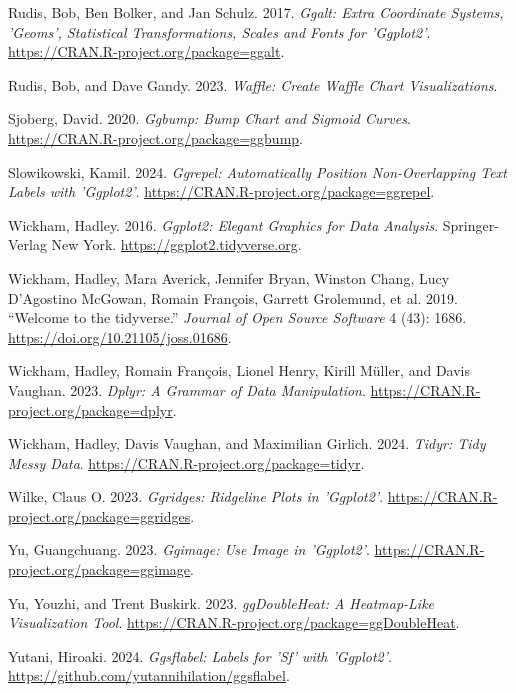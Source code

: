 \documentclass[
  letterpaper,
  DIV=11,
  numbers=noendperiod]{scrreprt}
\newlength{\cslhangindent}
\newenvironment{CSLReferences}[2] %
 {\begin{list}{}{%
  \setlength{\itemindent}{0pt}
  \setlength{\leftmargin}{0pt}
  \setlength{\parsep}{0pt}
  \ifodd #1
   \setlength{\leftmargin}{\cslhangindent}
   \setlength{\itemindent}{-1\cslhangindent}
  \fi
  \setlength{\itemsep}{#2\baselineskip}}}
 {\end{list}}
\begin{document}
\begin{CSLReferences}{1}{0}
Rudis, Bob, Ben Bolker, and Jan Schulz. 2017. \emph{Ggalt: Extra
Coordinate Systems, 'Geoms', Statistical Transformations, Scales and
Fonts for 'Ggplot2'}. \url{https://CRAN.R-project.org/package=ggalt}.

Rudis, Bob, and Dave Gandy. 2023. \emph{Waffle: Create Waffle Chart
Visualizations}.

Sjoberg, David. 2020. \emph{Ggbump: Bump Chart and Sigmoid Curves}.
\url{https://CRAN.R-project.org/package=ggbump}.

Slowikowski, Kamil. 2024. \emph{Ggrepel: Automatically Position
Non-Overlapping Text Labels with 'Ggplot2'}.
\url{https://CRAN.R-project.org/package=ggrepel}.

Wickham, Hadley. 2016. \emph{Ggplot2: Elegant Graphics for Data
Analysis}. Springer-Verlag New York.
\url{https://ggplot2.tidyverse.org}.

Wickham, Hadley, Mara Averick, Jennifer Bryan, Winston Chang, Lucy
D'Agostino McGowan, Romain François, Garrett Grolemund, et al. 2019.
{``Welcome to the {tidyverse}.''} \emph{Journal of Open Source Software}
4 (43): 1686. \url{https://doi.org/10.21105/joss.01686}.

Wickham, Hadley, Romain François, Lionel Henry, Kirill Müller, and Davis
Vaughan. 2023. \emph{Dplyr: A Grammar of Data Manipulation}.
\url{https://CRAN.R-project.org/package=dplyr}.

Wickham, Hadley, Davis Vaughan, and Maximilian Girlich. 2024.
\emph{Tidyr: Tidy Messy Data}.
\url{https://CRAN.R-project.org/package=tidyr}.

Wilke, Claus O. 2023. \emph{Ggridges: Ridgeline Plots in 'Ggplot2'}.
\url{https://CRAN.R-project.org/package=ggridges}.

Yu, Guangchuang. 2023. \emph{Ggimage: Use Image in 'Ggplot2'}.
\url{https://CRAN.R-project.org/package=ggimage}.

Yu, Youzhi, and Trent Buskirk. 2023. \emph{ggDoubleHeat: A Heatmap-Like
Visualization Tool}.
\url{https://CRAN.R-project.org/package=ggDoubleHeat}.

Yutani, Hiroaki. 2024. \emph{Ggsflabel: Labels for 'Sf' with 'Ggplot2'}.
\url{https://github.com/yutannihilation/ggsflabel}.

\end{CSLReferences}
\end{document}
